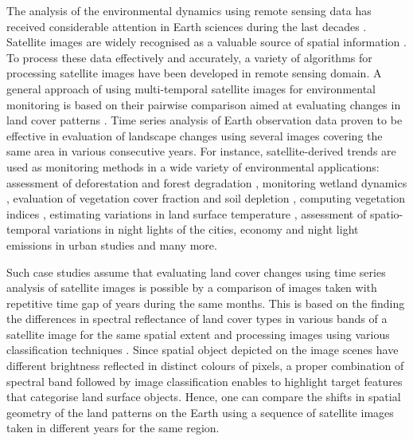 \documentclass[12pt,a4paper,oneside]{article}
\def \newpar{\vspace{6pt}}
\begin{document}
\newpar The analysis of the environmental dynamics using remote sensing data has received considerable attention in Earth sciences during the last decades \citep{SULTANA2023267,PAYRA2023239,MERTIKAS2021107}. Satellite images are widely recognised as a valuable source of spatial information \citep{Richards,Costel,Lerat}. To process these data effectively and accurately, a variety of algorithms for processing satellite images have been developed in remote sensing domain. A general approach of using multi-temporal satellite images for environmental monitoring is based on their pairwise comparison aimed at evaluating changes in land cover patterns \citep{OGILVIE2015368,Hiernaux}. Time series analysis of Earth observation data proven to be effective in evaluation of landscape changes using several images covering the same area in various consecutive years. For instance, satellite-derived trends are used as monitoring methods in a wide variety of environmental applications: assessment of deforestation and forest degradation \citep{MASOLELE2021112600,rs11242999,ijgi11110573,rs9090905}, monitoring wetland dynamics \citep{KOVACS2022113267,land11122137}, evaluation of vegetation cover fraction and soil depletion \cite{DUBE2017112,rs15010020}, computing vegetation indices \citep{VENTER2020106206,app122412554,f13122066}, estimating variations in land surface temperature \citep{CARRILLONIQUETE2022104280}, assessment of spatio-temporal variations in night lights of the cities, economy and night light emissions in urban studies \citep{Rehman} and many more. 

\newpar Such case studies assume that evaluating land cover changes using time series analysis of satellite images is possible by a comparison of images taken with repetitive time gap of years during the same months. This is based on the finding the differences in spectral reflectance of land cover types in various bands of a satellite image for the same spatial extent and processing images using various classification techniques \citep{SHAHI202385,MERRY2023269,GANDHI201681}. Since spatial object depicted on the image scenes have different brightness reflected in distinct colours of pixels, a proper combination of spectral band followed by image classification enables to highlight target features that categorise land surface objects. Hence, one can compare the shifts in spatial geometry of the land patterns on the Earth using a sequence of satellite images taken in different years for the same region. 
\end{document}
